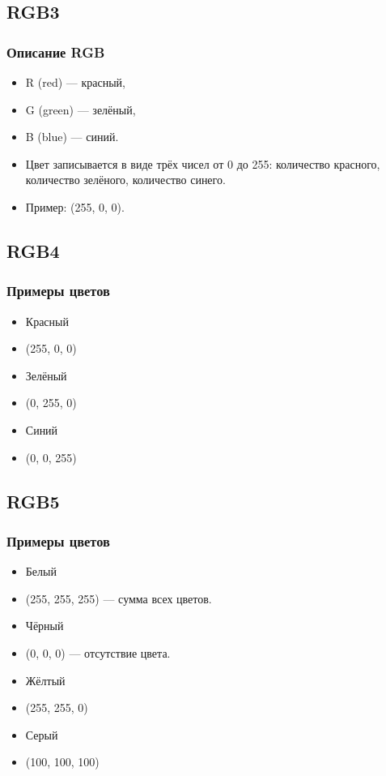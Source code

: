 \documentclass[compress,red]{beamer}
\begin{document}
\subsection{RGB3}
\begin{frame}[fragile]
  \frametitle{Описание RGB}
  \begin{itemize}[<+->]
    \item R (red) --- красный,
    \item G (green) --- зелёный,
    \item B (blue) --- синий.
    \item Цвет записывается в виде трёх чисел от 0 до 255: количество красного, количество зелёного, количество синего.
    \item Пример: (255, 0, 0).
  \end{itemize}
\end{frame}

\subsection{RGB4}
\begin{frame}[fragile]
  \frametitle{Примеры цветов}
  \begin{itemize}[<+->]
    \item Красный
    \item (255, 0, 0)
    \item Зелёный
    \item (0, 255, 0)
    \item Синий
    \item (0, 0, 255)
  \end{itemize}
\end{frame}

\subsection{RGB5}
\begin{frame}[fragile]
  \frametitle{Примеры цветов}
  \begin{itemize}[<+->]
    \item Белый
    \item (255, 255, 255) --- сумма всех цветов.
    \item Чёрный
    \item (0, 0, 0) --- отсутствие цвета.
    \item Жёлтый
    \item (255, 255, 0)
    \item Серый
    \item (100, 100, 100)
  \end{itemize}
\end{frame}
\end{document}
